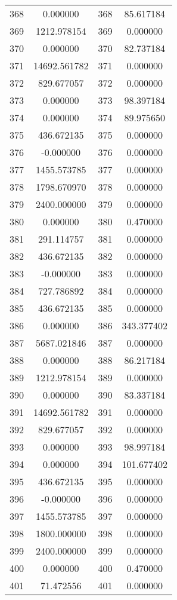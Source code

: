 \documentclass[12pt]{article}
\begin{document}
\begin{longtable}{@{}cccc@{}}
368 & 0.000000 & 368 & 85.617184 \\
369 & 1212.978154 & 369 & 0.000000 \\
370 & 0.000000 & 370 & 82.737184 \\
371 & 14692.561782 & 371 & 0.000000 \\
372 & 829.677057 & 372 & 0.000000 \\
373 & 0.000000 & 373 & 98.397184 \\
374 & 0.000000 & 374 & 89.975650 \\
375 & 436.672135 & 375 & 0.000000 \\
376 & -0.000000 & 376 & 0.000000 \\
377 & 1455.573785 & 377 & 0.000000 \\
378 & 1798.670970 & 378 & 0.000000 \\
379 & 2400.000000 & 379 & 0.000000 \\
380 & 0.000000 & 380 & 0.470000 \\
381 & 291.114757 & 381 & 0.000000 \\
382 & 436.672135 & 382 & 0.000000 \\
383 & -0.000000 & 383 & 0.000000 \\
384 & 727.786892 & 384 & 0.000000 \\
385 & 436.672135 & 385 & 0.000000 \\
386 & 0.000000 & 386 & 343.377402 \\
387 & 5687.021846 & 387 & 0.000000 \\
388 & 0.000000 & 388 & 86.217184 \\
389 & 1212.978154 & 389 & 0.000000 \\
390 & 0.000000 & 390 & 83.337184 \\
391 & 14692.561782 & 391 & 0.000000 \\
392 & 829.677057 & 392 & 0.000000 \\
393 & 0.000000 & 393 & 98.997184 \\
394 & 0.000000 & 394 & 101.677402 \\
395 & 436.672135 & 395 & 0.000000 \\
396 & -0.000000 & 396 & 0.000000 \\
397 & 1455.573785 & 397 & 0.000000 \\
398 & 1800.000000 & 398 & 0.000000 \\
399 & 2400.000000 & 399 & 0.000000 \\
400 & 0.000000 & 400 & 0.470000 \\
401 & 71.472556 & 401 & 0.000000 \\

\end{longtable}
\end{document}
